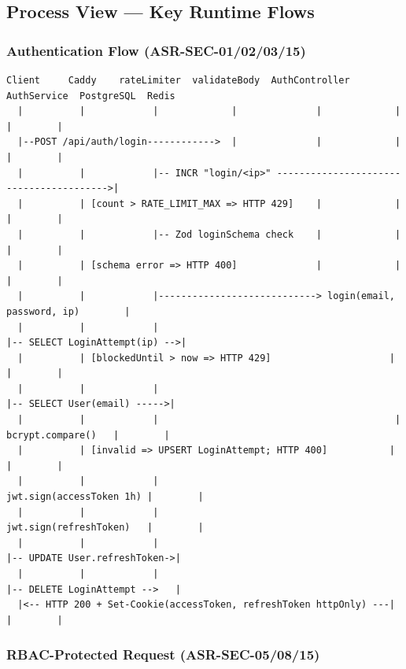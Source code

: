 \documentclass[12pt,a4paper]{article}
\begin{document}
\subsection{Process View --- Key Runtime Flows}

\subsubsection{Authentication Flow (ASR-SEC-01/02/03/15)}

\begin{lstlisting}[caption={Login sequence -- auth.controller.ts + auth.service.ts}]
Client     Caddy    rateLimiter  validateBody  AuthController  AuthService  PostgreSQL  Redis
  |          |            |             |              |             |            |        |
  |--POST /api/auth/login------------>  |              |             |            |        |
  |          |            |-- INCR "login/<ip>" ---------------------------------------->|
  |          | [count > RATE_LIMIT_MAX => HTTP 429]    |             |            |        |
  |          |            |-- Zod loginSchema check    |             |            |        |
  |          | [schema error => HTTP 400]              |             |            |        |
  |          |            |----------------------------> login(email, password, ip)        |
  |          |            |                                          |-- SELECT LoginAttempt(ip) -->|
  |          | [blockedUntil > now => HTTP 429]                     |            |        |
  |          |            |                                          |-- SELECT User(email) ----->|
  |          |            |                                          | bcrypt.compare()   |        |
  |          | [invalid => UPSERT LoginAttempt; HTTP 400]           |            |        |
  |          |            |                             jwt.sign(accessToken 1h) |        |
  |          |            |                             jwt.sign(refreshToken)   |        |
  |          |            |                                          |-- UPDATE User.refreshToken->|
  |          |            |                                          |-- DELETE LoginAttempt -->   |
  |<-- HTTP 200 + Set-Cookie(accessToken, refreshToken httpOnly) ---|            |        |
\end{lstlisting}

\subsubsection{RBAC-Protected Request (ASR-SEC-05/08/15)}
\end{document}

